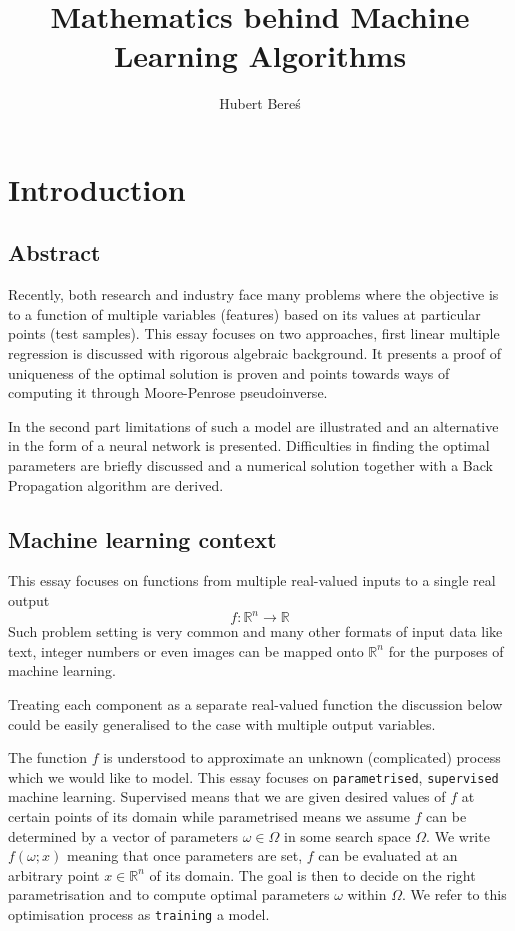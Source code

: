 \documentclass[a4paper,11pt]{article}
\title{Mathematics behind Machine Learning Algorithms}
\author{Hubert Bereś}
\theoremstyle{break}
\newcommand{\R}{\mathbb{R}}
\begin{document}
\maketitle

\section{Introduction}

\subsection{Abstract}

Recently, both research and industry face many problems where the objective is to  a function of multiple variables (features) based on its values at particular points (test samples). This essay focuses on two approaches, first linear multiple regression is discussed with rigorous algebraic background. It presents a proof of uniqueness of the optimal solution is proven and points towards ways of computing it through Moore-Penrose pseudoinverse.

In the second part limitations of such a model are illustrated and an alternative in the form of a neural network is presented. Difficulties in finding the optimal parameters are briefly discussed and a numerical solution together with a Back Propagation algorithm are derived.

\subsection{Machine learning context}

This essay focuses on functions from multiple real-valued inputs to a single real output
$$ f : \R^n \to \R $$
Such problem setting is very common and many other formats of input data like text, integer numbers or even images can be mapped onto $\R^n$ for the purposes of machine learning.

Treating each  component as a separate real-valued function the discussion below could be easily generalised to the case with multiple output variables.

The function $f$ is understood to approximate an unknown (complicated) process which we would like to model.
This essay focuses on {\tt parametrised}, {\tt supervised} machine learning.
Supervised means that we are given desired values of $f$ at certain points of its domain while parametrised means we assume $f$ can be determined by a vector of parameters $ \omega \in \Omega$ in some search space $\Omega$.
We write $ f(\omega; x) $ meaning that once parameters are set, $f$ can be evaluated at an arbitrary point $x \in \R^n$ of its domain.
The goal is then to decide on the right parametrisation and to compute optimal parameters $\omega$ within $\Omega$. We refer to this optimisation process as {\tt training} a model.
\end{document}

